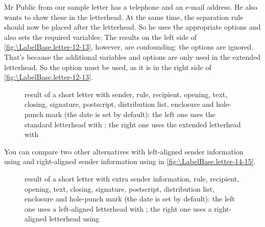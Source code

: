 \begin{Example}
  Mr Public from our sample letter has a telephone and an e-mail address. He
  also wants to show these in the letterhead. At the same time, the separation
  rule should now be placed after the letterhead. So he uses the appropriate
  options and also sets the required variables:%
  The results on the left side of \autoref{fig:\LabelBase.letter-12-13},
  however, are confounding: the options are ignored. That's because the
  additional variables and options are only used in the extended letterhead.
  So the  option must be used, as it is
  in the right side of
  \autoref{fig:\LabelBase.letter-12-13}.
  \begin{figure}
    \centering
    \quad
    \caption[{Example: letter with extra sender information, rule,
      recipient, opening, text, closing, signature, postscript, distribution
      list, enclosure, and hole-punch mark; standard vs. extended letterhead}]
    {result of a short letter with sender, rule, recipient, opening, text,
      closing, signature, postscript, distribution list, enclosure and
      hole-punch mark (the date is set by default): the left one uses the
      standard letterhead with
      ; the right one uses the
      extended letterhead with }
    \label{fig:\LabelBase.letter-12-13}
  \end{figure}

  You can compare two other alternatives with left-aligned sender information using
   and right-aligned sender information
  using  in
  \autoref{fig:\LabelBase.letter-14-15}.
  \begin{figure}
    \centering
    \quad
    \caption[{Example: letter with extra sender information, rule,
      recipient, opening, text, closing, signature, postscript, distribution
      list, enclosure, and hole-punch mark; left- vs. right-aligned
      letterhead}]
    {result of a short letter with extra sender information, rule,
      recipient, opening, text, closing, signature, postscript, distribution
      list, enclosure and hole-punch mark (the date is set by default):
      the left one uses a left-aligned letterhead with
      ; the right one uses a
      right-aligned letterhead using
      }
    \label{fig:\LabelBase.letter-14-15}
  \end{figure}
\end{Example}
%
\EndIndexGroup


